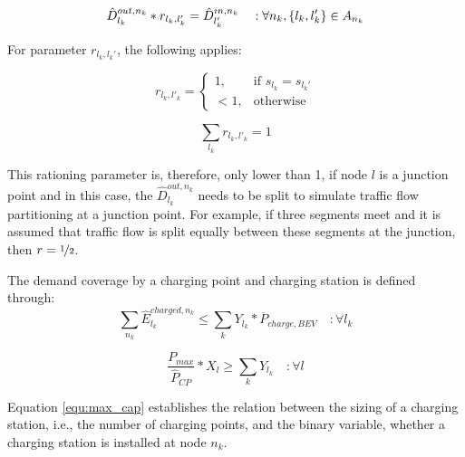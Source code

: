         \begin{equation}
               \hat{D}_{l_k}^{out, n_k}  * r_{l_k, l'_k} = \hat{D}_{l'_k}^{in, n_k} \quad : \forall n_k, \{l_k, l'_k\} \in A_{n_k}\\
        \end{equation}
    
        For parameter $r_{l_k, l_k'}$, the following applies:
    
    
        \begin{equation} \label{form:1}
    r_{l_k, l'_k} = 
        \begin{cases}
            1,& \text{if } s_{l_k} = s_{l_k'}\\
            <1,              & \text{otherwise}
        \end{cases}
        \end{equation}

        \begin{equation} \label{form:2}
            \sum_{l_k} r_{l_k, l'_k} = 1
        \end{equation}

    This rationing parameter is, therefore, only lower than 1, if node $l$ is a junction point and in this case, the $\hat{D}_{l_k}^{out, n_k}$ needs to be split to simulate traffic flow partitioning at a junction point. For example, if three segments meet and it is assumed that traffic flow is split equally between these segments at the junction, then $r=\nicefrac{1}{2}$.  

    
    The demand coverage by a charging point and charging station is defined through: 
        \begin{equation}
               \sum_{n_k} \hat{E}_{l_k}^{charged,n_k} \leq \sum_k Y_{l_k} * \overline{P}_{charge, BEV} \quad : \forall l_k  
        \end{equation}
    
    
    
        \begin{equation} \label{equ:max_cap}
               \frac{P_{max}}{\hat{P}_{CP}} * X_{l} \geq \sum_k Y_{l_k} \quad : \forall l 
        \end{equation}
    
    Equation \ref{equ:max_cap} establishes the relation between the sizing of a charging station, i.e., the number of charging points, and the binary variable, whether a charging station is installed at node $n_k$. 
    

    
    

